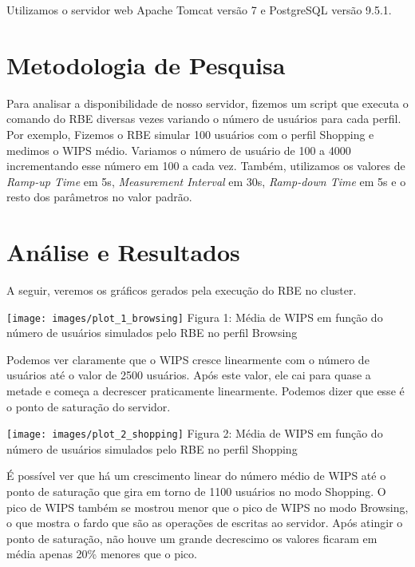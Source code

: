 \documentclass[11pt,twoside]{article}
\begin{document}
	Utilizamos o servidor web Apache Tomcat vers\~ao 7 e PostgreSQL vers\~ao 9.5.1.

\section{Metodologia de Pesquisa}
\setlength{\parindent}{4ex}
Para analisar a disponibilidade de nosso servidor, fizemos um script que executa o comando do RBE diversas vezes variando o n\'umero de usu\'arios para cada perfil. Por exemplo, Fizemos o RBE simular 100 usu\'arios com o perfil Shopping e medimos o WIPS m\'edio. Variamos o n\'umero de usu\'ario de 100 a 4000 incrementando esse n\'umero em 100 a cada vez. Tamb\'em, utilizamos os valores de \textit{Ramp-up Time} em 5s, \textit{Measurement Interval} em 30s, \textit{Ramp-down Time} em 5s e o resto dos par\^ametros no valor padr\~ao.

\section{An\'alise e Resultados}
\setlength{\parindent}{4ex}
A seguir, veremos os gr\'aficos gerados pela execu\c{c}\~ao do RBE no cluster.

\begin{center}
\texttt{[image: images/plot\_1\_browsing]}
Figura 1: M\'edia de WIPS em fun\c{c}\~ao do n\'umero de usu\'arios simulados pelo RBE no perfil Browsing
\end{center}

Podemos ver claramente que o WIPS cresce linearmente com o n\'umero de usu\'arios at\'e o valor de 2500 usu\'arios. Ap\'os este valor, ele cai para quase a metade e come\c{c}a a decrescer praticamente linearmente. Podemos dizer que esse \'e o ponto de satura\c{c}\~ao do servidor.

\begin{center}
\texttt{[image: images/plot\_2\_shopping]}
Figura 2: M\'edia de WIPS em fun\c{c}\~ao do n\'umero de usu\'arios simulados pelo RBE no perfil Shopping
\end{center}

\'E poss\'ivel ver que h\'a um crescimento linear do n\'umero m\'edio de WIPS at\'e o ponto de satura\c{c}\~ao que gira em torno de 1100 usu\'arios no modo Shopping. O pico de WIPS tamb\'em se mostrou menor que o pico de WIPS no modo Browsing, o que mostra o fardo que s\~ao as opera\c{c}\~oes de escritas ao servidor. Ap\'os atingir o ponto de satura\c{c}\~ao, n\~ao houve um grande decrescimo os valores ficaram em m\'edia apenas 20\% menores que o pico.
\end{document}

